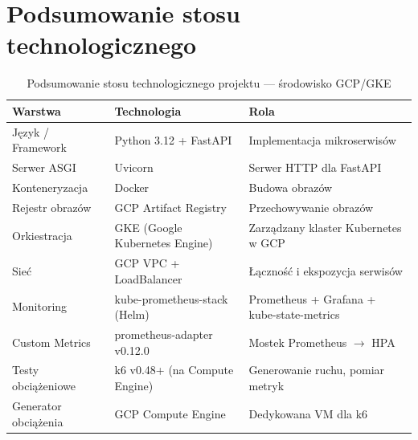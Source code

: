 \section{Podsumowanie stosu technologicznego}

\begin{table}[H]
  \centering
  \begin{tabularx}{\textwidth}{|l|X|l|}
    \hline
    \textbf{Warstwa} & \textbf{Technologia} & \textbf{Rola} \\
    \hline
    Język / Framework & Python 3.12 + FastAPI & Implementacja mikroserwisów \\
    Serwer ASGI & Uvicorn & Serwer HTTP dla FastAPI \\
    Konteneryzacja & Docker & Budowa obrazów \\
    Rejestr obrazów & GCP Artifact Registry & Przechowywanie obrazów \\
    Orkiestracja & GKE (Google Kubernetes Engine) & Zarządzany klaster Kubernetes w GCP \\
    Sieć & GCP VPC + LoadBalancer & Łączność i ekspozycja serwisów \\
    Monitoring & kube-prometheus-stack (Helm) & Prometheus + Grafana + kube-state-metrics \\
    Custom Metrics & prometheus-adapter v0.12.0 & Mostek Prometheus $\rightarrow$ HPA \\
    Testy obciążeniowe & k6 v0.48+ (na Compute Engine) & Generowanie ruchu, pomiar metryk \\
    Generator obciążenia & GCP Compute Engine & Dedykowana VM dla k6 \\
    \hline
  \end{tabularx}
  \caption{Podsumowanie stosu technologicznego projektu --- środowisko GCP/GKE}
  \label{tab:tech-stack}
\end{table}
